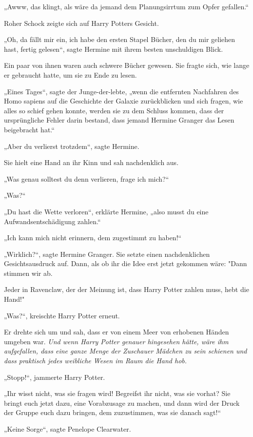 {„Awww, das klingt, als wäre da jemand dem Planungsirrtum zum Opfer gefallen.“

Roher Schock zeigte sich auf Harry Potters Gesicht.

„Oh, da fällt mir ein, ich habe den ersten Stapel Bücher, den du mir geliehen hast, fertig gelesen“, sagte Hermine mit ihrem besten unschuldigen Blick.

Ein paar von ihnen waren auch schwere Bücher gewesen. Sie fragte sich, wie lange er gebraucht hatte, um sie zu Ende zu lesen.

„Eines Tages“, sagte der Junge-der-lebte, „wenn die entfernten Nachfahren des Homo sapiens auf die Geschichte der Galaxie zurückblicken und sich fragen, wie alles so schief gehen konnte, werden sie zu dem Schluss kommen, dass der ursprüngliche Fehler darin bestand, dass jemand Hermine Granger das Lesen beigebracht hat.“

„Aber du verlierst trotzdem“, sagte Hermine.

Sie hielt eine Hand an ihr Kinn und sah nachdenklich aus.

„Was genau solltest du denn verlieren, frage ich mich?“

„Was?“

„Du hast die Wette verloren“, erklärte Hermine, „also musst du eine Aufwandsentschädigung zahlen.“

„Ich kann mich nicht erinnern, dem zugestimmt zu haben!“

„Wirklich?“, sagte Hermine Granger. Sie setzte einen nachdenklichen Gesichtsausdruck auf. Dann, als ob ihr die Idee erst jetzt gekommen wäre: "Dann stimmen wir ab.

Jeder in Ravenclaw, der der Meinung ist, dass Harry Potter zahlen muss, hebt die Hand!"

„Was?“, kreischte Harry Potter erneut.

Er drehte sich um und sah, dass er von einem Meer von erhobenen Händen umgeben war. \emph{Und wenn Harry Potter genauer hingesehen hätte, wäre ihm aufgefallen, dass eine ganze Menge der Zuschauer Mädchen zu sein schienen und dass praktisch jedes weibliche Wesen im Raum die Hand hob.}

„Stopp!“, jammerte Harry Potter.

„Ihr wisst nicht, was sie fragen wird! Begreifst ihr nicht, was sie vorhat? Sie bringt euch jetzt dazu, eine Vorabzusage zu machen, und dann wird der Druck der Gruppe euch dazu bringen, dem zuzustimmen, was sie danach sagt!“

„Keine Sorge“, sagte Penelope Clearwater.

}
